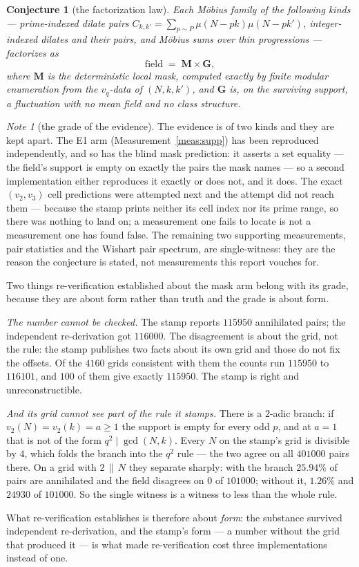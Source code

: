 \documentclass[11pt,a4paper]{article}
\theoremstyle{plain}
\newtheorem{conjecture}[theorem]{Conjecture}
\theoremstyle{definition}
\theoremstyle{remark}
\newtheorem{note}[theorem]{Note}
\begin{document}
\begin{conjecture}[the factorization law]\label{conj:L}
Each M\"obius family of the following kinds --- prime-indexed dilate
pairs $C_{k,k'}=\sum_{p\sim P}\mu(N-pk)\mu(N-pk')$, integer-indexed
dilates and their pairs, and M\"obius sums over thin progressions ---
factorizes as
\[
  \text{field}\;=\;\mathbf M\times\mathbf G,
\]
where $\mathbf M$ is the deterministic local mask, computed exactly by
finite modular enumeration from the $v_q$-data of $(N,k,k')$, and
$\mathbf G$ is, on the surviving support, a fluctuation with no mean
field and no class structure.
\end{conjecture}

\begin{note}[the grade of the evidence]\label{note:Lgrade}
The evidence is of two kinds and they are kept apart. The E1 arm
(Measurement~\ref{meas:supp}) has been reproduced independently, and
so has the blind mask prediction: it asserts a set equality --- the
field's support is empty on exactly the pairs the mask names --- so a
second implementation either reproduces it exactly or does not, and it
does. The exact $(v_2,v_3)$ cell predictions were attempted next and
the attempt did not reach them --- because the stamp prints neither its
cell index nor its prime range, so there was nothing to land on; a
measurement one fails to locate is not a measurement one has found
false. The remaining two supporting measurements, pair statistics and
the Wishart pair spectrum, are single-witness: they are the reason the
conjecture is stated, not measurements this report vouches for.

Two things re-verification established about the mask arm belong with
its grade, because they are about form rather than truth and the grade
is about form.

\emph{The number cannot be checked.} The stamp reports $115950$
annihilated pairs; the independent re-derivation got $116000$. The
disagreement is about the grid, not the rule: the stamp publishes two
facts about its own grid and those do not fix the offsets. Of the
$4160$ grids consistent with them the counts run $115950$ to $116101$,
and $100$ of them give exactly $115950$. The stamp is right and
unreconstructible.

\emph{And its grid cannot see part of the rule it stamps.} There is a
$2$-adic branch: if $v_2(N)=v_2(k)=a\ge1$ the support is empty for
every odd $p$, and at $a=1$ that is not of the form
$q^2\mid\gcd(N,k)$. Every $N$ on the stamp's grid is divisible by $4$,
which folds the branch into the $q^2$ rule --- the two agree on all
$401000$ pairs there. On a grid with $2\,\|\,N$ they separate sharply:
with the branch $25.94\%$ of pairs are annihilated and the field
disagrees on $0$ of $101000$; without it, $1.26\%$ and $24930$ of
$101000$. So the single witness is a witness to less than the whole
rule.

What re-verification establishes is therefore about \emph{form}: the
substance survived independent re-derivation, and the stamp's form ---
a number without the grid that produced it --- is what made
re-verification cost three implementations instead of one.
\end{note}
\end{document}
